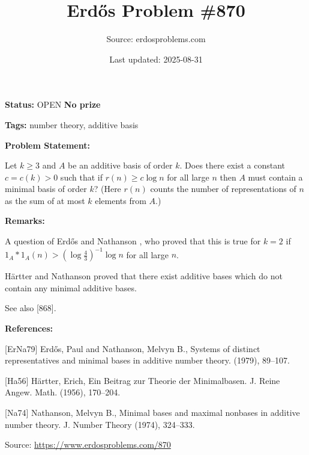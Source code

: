 \documentclass{article}
\title{Erd\H{o}s Problem \#870}
\date{Last updated: 2025-08-31}
\author{Source: erdosproblems.com}
\begin{document}
\maketitle

\noindent\textbf{Status:} OPEN \quad \textbf{No prize}

\noindent\textbf{Tags:} number theory, additive basis

\medskip
\noindent\textbf{Problem Statement:}

Let $k\geq 3$ and $A$ be an additive basis of order $k$. Does there exist a constant $c=c(k)>0$ such that if $r(n)\geq c\log n$ for all large $n$ then $A$ must contain a minimal basis of order $k$? (Here $r(n)$ counts the number of representations of $n$ as the sum of at most $k$ elements from $A$.)

\bigskip
\noindent\textbf{Remarks:}

A question of Erd\H{o}s and Nathanson \cite{ErNa79}, who proved that this is true for $k=2$ if $1_A\ast 1_A(n) > (\log \frac{4}{3})^{-1}\log n$ for all large $n$.

Härtter \cite{Ha56} and Nathanson \cite{Na74} proved that there exist additive bases which do not contain any minimal additive bases. 

See also [868].

\bigskip
\noindent\textbf{References:}

[ErNa79] Erd\H{o}s, Paul and Nathanson, Melvyn B., Systems of distinct representatives and minimal bases in
additive number theory. (1979), 89--107.
 
 [Ha56] H\"{a}rtter, Erich, Ein Beitrag zur Theorie der {M}inimalbasen. J. Reine Angew. Math. (1956), 170--204.
 
 [Na74] Nathanson, Melvyn B., Minimal bases and maximal nonbases in additive number theory. J. Number Theory (1974), 324--333.

\bigskip
\noindent\small{Source: \url{https://www.erdosproblems.com/870}}
\end{document}

